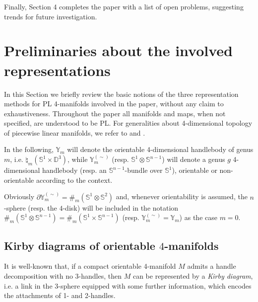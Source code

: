 \documentclass[12pt,a4paper]{article}
\begin{document}
Finally, Section 4 completes the paper with a list of open problems, suggesting trends for future investigation. 



\bigskip 

\section{Preliminaries about the involved representations}
In this Section we briefly review the basic notions of the three representation methods for PL 4-manifolds involved in the paper, without any claim to exhaustiveness. Throughout the paper all manifolds and maps, when not specified, are understood to be PL. For generalities about 4-dimensional topology of piecewise linear manifolds, we refer to \cite{[M]} and \cite{GS}. 
\medskip

In the following,  ${\mathbb Y}_m$ will denote the orientable 4-dimensional handlebody of genus $m$, i.e. $\natural_m (\mathbb S^1 \times \mathbb D^3)$, while  
${\mathbb Y}_m^{(\sim)}$ (resp. $\mathbb S^1\otimes\mathbb S^{n-1}$) will denote a  genus $g$ 4-dimensional handlebody (resp.  an $\mathbb S^{n-1}$-bundle over $\mathbb S^1$), orientable or non-orientable according to the context. 

Obviously ${\partial{\mathbb Y}}_m^{(\sim)} = \#_m(\mathbb S^1 \otimes \mathbb S^2)$ and, whenever orientability is assumed, the $n$-sphere (resp. the $4$-disk) will be included in the notation $\#_m(\mathbb S^1 \otimes \mathbb S^{n-1}) = \#_m(\mathbb S^1 \times \mathbb S^{n-1})$  (resp. ${\mathbb Y}_m^{(\sim)}={\mathbb Y}_m$) as the case $m=0.$


\bigskip

\subsection{Kirby diagrams of orientable $4$-manifolds}\label{ss:Kirby diagrams} 
\smallskip

It is well-known that, if a compact orientable 4-manifold $M$ admits a handle decomposition with no 3-handles, then $M$ can be represented by a {\it Kirby diagram}, i.e. a link in the 3-sphere equipped with some further information, which encodes the attachments of 1- and 2-handles. 
\end{document}
